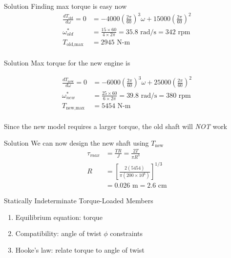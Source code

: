 \documentclass[10pt, svgnames]{beamer}
\begin{document}
\begin{frame}[label={sec:orga955b79}]{Solution Finding max torque is easy now}
\begin{align*}
    \frac{dT_{\text{old}}}{d\omega} = 0 &= -4000 (\frac{2\pi}{60})^{3} \omega + 15000 (\frac{2\pi}{60})^{2}\\
    \omega_{old}^{*} &= \frac{15 \times 60}{4 \times 2\pi} = 35.8 \text{ rad/s} = 342 \text{ rpm} \\
    T_{\text{old,} \max} &= 2945 \text{ N-m} \\
\end{align*}
\end{frame}

\begin{frame}[label={sec:orgb2b97c9}]{Solution}
Max torque for the new engine is

\begin{align*}
    \frac{dT_{\text{new}}}{d\omega} = 0 &= -6000 (\frac{2\pi}{60})^{3} \omega + 25000 (\frac{2\pi}{60})^{2}\\
    \omega_{new}^{*} &= \frac{25 \times 60}{6 \times 2\pi} = 39.8 \text{ rad/s} = 380 \text{ rpm} \\
    T_{\text{new,} \max} &= 5454 \text{ N-m} \\
\end{align*}

Since the new model requires a larger torque, the old shaft will \emph{NOT}
work
\end{frame}

\begin{frame}[label={sec:orgf005eff}]{Solution}
We can now design the new shaft using \(T_{\text{new}}\)
\begin{align*}
    \tau_{max} &= \frac{TR}{J} = \frac{2T}{\pi R^{3}} \\
    R &= \left[ \frac{2(5454)}{\pi ( 200 \times 10^{6} )} \right]^{1/3} \\
               &= 0.026 \text{ m} = 2.6 \text{ cm}
\end{align*}
\end{frame}

\begin{frame}[label={sec:org4a2ddf2}]{Statically Indeterminate Torque-Loaded Members}
\begin{enumerate}
\item Equilibrium equation: torque

\item Compatibility: angle of twist \(\phi\) constraints

\item Hooke's law: relate torque to angle of twist
\end{enumerate}
\end{frame}
\end{document}
